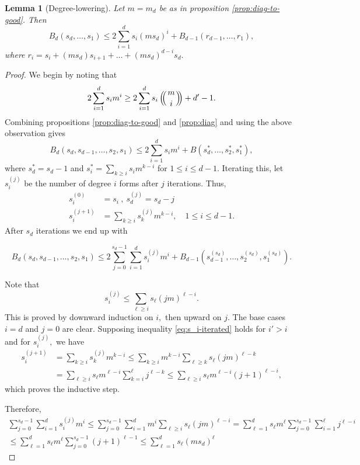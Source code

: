 \documentclass[12pt]{amsart}
\newtheorem{lemma}[theorem]{Lemma}
\theoremstyle{definition}
\def\multiset#1#2{\ensuremath{\left(\kern-.3em\left(\genfrac{}{}{0pt}{}{#1}{#2}\right)\kern-.3em\right)}}
\begin{document}
\begin{lemma}[Degree-lowering]\label{lem:deg-lower}
    Let $m = m_d$ be as in proposition \ref{prop:diag-to-good}. Then 
    \[
    B_d(s_d,\ldots,s_1) \le 
    2 \sum_{i=1}^{d} s_i (ms_d)^i  +  B_{d-1}(r_{d-1},\ldots,r_1),
    \]
    where $r_i = s_i + (ms_d)s_{i+1}+\ldots+(ms_d)^{d-i} s_d.$
\end{lemma}

\begin{proof}

We begin by noting that 
    \[
    2\sum_{i=1}^d s_i m^i \ge 2\sum_{i=1}^d s_i\multiset{m}{i} + d'-1.
    \]
Combining propositions \ref{prop:diag-to-good} and \ref{prop:diag} and using the above observation gives
\[
    B_d(s_d,s_{d-1},\ldots,s_2,s_1) \le  2\sum_{i=1}^d s_im^i+B(s^*_d,\ldots,s^*_2,s^*_1),
    \]
    where $s^*_d = s_d-1$ and $s^*_i = \sum_{k\ge i} s_im^{k-i}$ for $1\le i\le d-1.$ Iterating this, let $s_i^{(j)}$ be the number of degree $i$ forms after $j$ iterations. Thus, 
    \begin{align*}
         s_i^{(0)} &= s_i\ ,\ s_d^{(j)} = s_d-j \\ s_i^{(j+1)} &= \sum_{k\ge i} s_k^{(j)} m^{k-i}, \quad 1\le i\le d-1.
    \end{align*}
    After $s_d$ iterations we end up with
    
\begin{equation}\label{eq:main-prop-iterated}
     B_d(s_d,s_{d-1},\ldots,s_2,s_1) \le 2\sum_{j=0}^{s_d-1}\sum_{i=1}^d s_i^{(j)}m^i + B_{d-1}(s_{d-1}^{(s_d)},\ldots,s_2^{(s_d)},s_1^{(s_d)}).
\end{equation}

Note that
\begin{equation}\label{eq:s_i-iterated}
    s_i^{(j)} \le \sum_{\ell \ge i} s_\ell(jm)^{\ell-i}.
\end{equation}
This is proved by downward induction on $i,$ then upward on $j.$ The base cases $i =d$ and $j = 0$ are clear. Supposing inequality \eqref{eq:s_i-iterated} holds for $i' >i$ and for $s_i^{(j)},$ we have 
\begin{align*}
    s_i^{(j+1)} &= \sum_{k\ge i} s_k^{(j)} m^{k-i} \le \sum_{k\ge i} m^{k-i} \sum_{\ell \ge k} s_\ell(jm)^{\ell-k} \\
    &= \sum_{\ell \ge i} s_\ell m^{\ell-i} \sum_{k=i}^\ell  j^{\ell-k} \le \sum_{\ell \ge i} s_\ell m^{\ell-i} (j+1)^{\ell-i},
\end{align*}
which proves the inductive step.

Therefore,
\begin{multline}\label{eq:s_i-sum-iterated}
        \sum_{j=0}^{s_d-1}\sum_{i=1}^d s_i^{(j)}m^i \le \sum_{j=0}^{s_d-1}\sum_{i=1}^d m^i \sum_{\ell \ge i} s_\ell(jm)^{\ell-i}  = \sum_{\ell = 1}^d s_\ell m^\ell \sum_{j=0}^{s_d-1} \sum_{i=1}^\ell j^{\ell-i}\\
        \le \sum_{\ell = 1}^d s_\ell m^\ell \sum_{j=0}^{s_d-1}  (j+1)^{\ell-1} \le \sum_{\ell = 1}^d s_\ell (ms_d)^\ell 
\end{multline} 


\end{proof}
\end{document}
